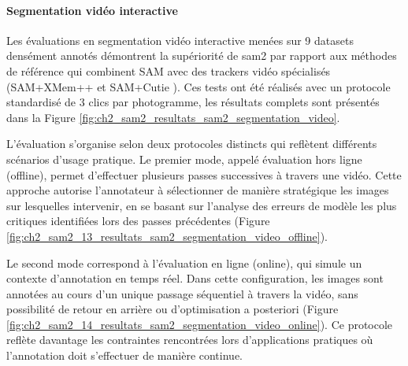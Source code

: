\paragraph{Segmentation vidéo interactive}
Les évaluations en segmentation vidéo interactive menées sur 9 datasets densément annotés démontrent la supériorité de \acrshort{sam2} par rapport aux méthodes de référence qui combinent SAM avec des trackers vidéo spécialisés (SAM+XMem++ \cite{bekuzarov_xmem_2023} \cite{noauthor_mbzuai-metaversexmem2_2025} et SAM+Cutie \cite{cheng_putting_2024} \cite{cheng_hkchengrexcutie_2025}). Ces tests ont été réalisés avec un protocole standardisé de 3 clics par photogramme, les résultats complets sont présentés dans la Figure \ref{fig:ch2_sam2_resultats_sam2_segmentation_video}.

L'évaluation s'organise selon deux protocoles distincts qui reflètent différents scénarios d'usage pratique. Le premier mode, appelé évaluation hors ligne (offline), permet d'effectuer plusieurs passes successives à travers une vidéo. Cette approche autorise l'annotateur à sélectionner de manière stratégique les images sur lesquelles intervenir, en se basant sur l'analyse des erreurs de modèle les plus critiques identifiées lors des passes précédentes (Figure \ref{fig:ch2_sam2_13_resultats_sam2_segmentation_video_offline}).

Le second mode correspond à l'évaluation en ligne (online), qui simule un contexte d'annotation en temps réel. Dans cette configuration, les images sont annotées au cours d'un unique passage séquentiel à travers la vidéo, sans possibilité de retour en arrière ou d'optimisation a posteriori (Figure \ref{fig:ch2_sam2_14_resultats_sam2_segmentation_video_online}). Ce protocole reflète davantage les contraintes rencontrées lors d'applications pratiques où l'annotation doit s'effectuer de manière continue.

